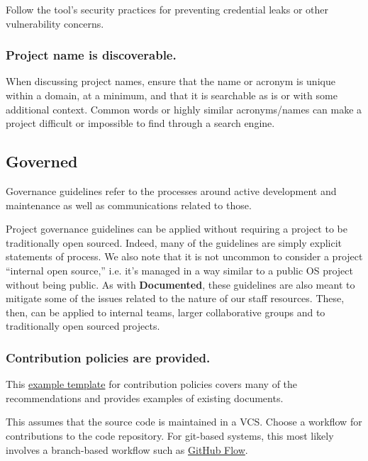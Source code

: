 \documentclass{article}
\newcounter{subsubsubsection}[subsubsection]
\begin{document}
Follow the tool’s security practices for preventing credential leaks or other vulnerability concerns.

\subsubsection{Project name is discoverable.}
When discussing project names, ensure that the name or acronym is unique within a domain, at a minimum, and that it is searchable as is or with some additional context. Common words or highly similar acronyms/names can make a project difficult or impossible to find through a search engine.

\subsection{Governed}
Governance guidelines refer to the processes around active development and maintenance as well as communications related to those.
 
Project governance guidelines can be applied without requiring a project to be traditionally open sourced. Indeed, many of the guidelines are simply explicit statements of process. We also note that it is not uncommon to consider a project “internal open source,” i.e. it’s managed in a way similar to a public OS project without being public. As with \textbf{Documented}, these guidelines are also meant to mitigate some of the issues related to the nature of our staff resources. These, then, can be applied to internal teams, larger collaborative groups and to traditionally open sourced projects. 

\subsubsection{Contribution policies are provided.}
This \href{https://github.com/nayafia/contributing-template/blob/master/CONTRIBUTING-template.md} {example template} for contribution policies covers many of the recommendations and provides examples of existing documents.

This assumes that the source code is maintained in a VCS. Choose a workflow for contributions to the code repository. For git-based systems, this most likely involves a branch-based workflow such as \href{https://guides.github.com/introduction/flow/} {GitHub Flow}. 
 
\end{document}
